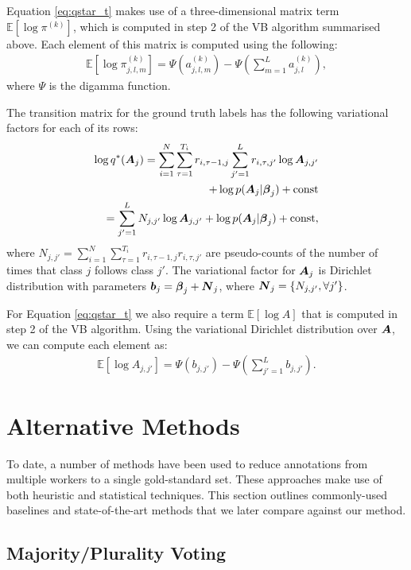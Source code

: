 Equation \ref{eq:qstar_t} makes use of a three-dimensional matrix term $\mathbb{E}[\log \pi^{(k)}]$, which is computed in step 2
of the VB algorithm summarised above. Each element of this matrix is computed using the following:
\begin{align}
  \mathbb{E}[\log \pi_{j,l,m}^{(k)}] = \Psi(a^{(k)}_{j,l,m}) - \Psi(\sum_{m=1}^L a^{(k)}_{j,l} ),
\end{align}
where $\Psi$ is the digamma function.

The transition matrix for the ground truth labels has the following variational factors for each of its rows:
\begin{align}
  \log q^*(\boldsymbol A_{j}) = \sum_{i=1}^N\sum_{\tau=1}^{T_i} r_{i,\tau-1,j} \sum_{j'=1}^L r_{i,\tau,j'}\log\boldsymbol A_{j,j'} \nonumber\\
  + \log p(\boldsymbol A_j | \boldsymbol\beta_j) + \mathrm{const} \nonumber\\
  = \sum_{j'=1}^L N_{j,j'}\log\boldsymbol A_{j,j'} 
  + \log p(\boldsymbol A_j | \boldsymbol\beta_j) + \mathrm{const},
\end{align}
where $N_{j,j'} = \sum_{i=1}^N \sum_{\tau=1}^{T_i} r_{i,\tau-1,j}r_{i,\tau,j'}$ are pseudo-counts of the 
number of times that class $j$ follows class $j'$. The variational factor for $\boldsymbol A_j$ is Dirichlet distribution with parameters $\boldsymbol b_j = \boldsymbol\beta_j + \boldsymbol N_{j}$, where $\boldsymbol N_{j} = \left\{ N_{j,j'} , \forall j' \right\}$.

For Equation \ref{eq:qstar_t} we also require a term $\mathbb{E}[\log A]$ that is computed in step 2
of the VB algorithm. Using the variational Dirichlet distribution over $\boldsymbol A$, we can compute each element as:
\begin{align}
  \mathbb{E}[\log A_{j,j'}] = \Psi(b_{j,j'}) - \Psi(\sum_{j'=1}^L b_{j,j'} ).
\end{align}


\section{Alternative Methods}\label{sec:alt}

To date, a number of methods have been used to reduce annotations from multiple workers to a single gold-standard set. These approaches make use of both heuristic and statistical techniques. This section outlines commonly-used baselines and state-of-the-art methods that we later compare against our method.

\subsection{Majority/Plurality Voting}


